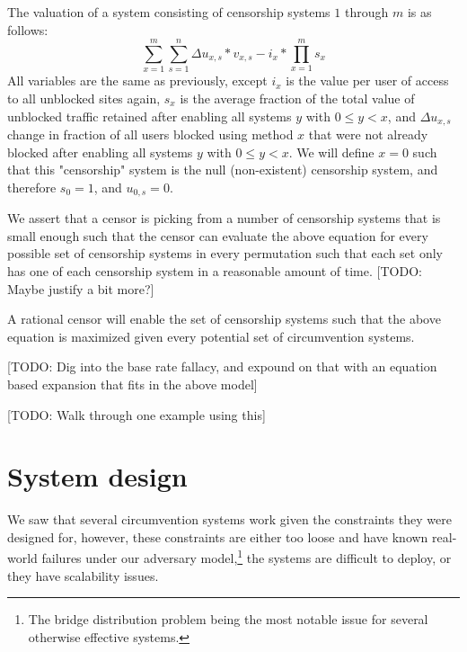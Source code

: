 \documentclass[12pt]{report}
\begin{document}
The valuation of a system consisting of censorship systems $1$ through $m$ is as follows:
\begin{equation}
\sum_{x=1}^{m}\sum_{s=1}^{n}\Delta u_{x,s}*v_{x,s} - i_{x} * \prod_{x=1}^{m}s_x
\end{equation}
All variables are the same as previously, except $i_x$ is the value per user of access to all unblocked sites again, $s_x$ is the average fraction of the total value of unblocked traffic retained after enabling all systems $y$ with $0\leq y<x$, and $\Delta  u_{x,s}$ change in fraction of all users blocked using method $x$ that were not already blocked after enabling all systems $y$ with $0\leq y<x$. We will define $x=0$ such that this "censorship" system is the null (non-existent) censorship system, and therefore $s_0 = 1$, and $u_{0,s} = 0$.

We assert that a censor is picking from a number of censorship systems that is small enough such that the censor can evaluate the above equation for every possible set of censorship systems in every permutation such that each set only has one of each censorship system in a reasonable amount of time. [TODO: Maybe justify a bit more?]

A rational censor will enable the set of censorship systems such that the above equation is maximized given every potential set of circumvention systems.

[TODO: Dig into the base rate fallacy, and expound on that with an equation based expansion that fits in the above model]

[TODO: Walk through one example using this]

\chapter{System design}

We saw that several circumvention systems work given the constraints they were designed for, however, these constraints are either too loose and have known real-world failures under our adversary model,\footnote{The bridge distribution problem being the most notable issue for several otherwise effective systems.} the systems are difficult to deploy, or they have scalability issues.
\end{document}

